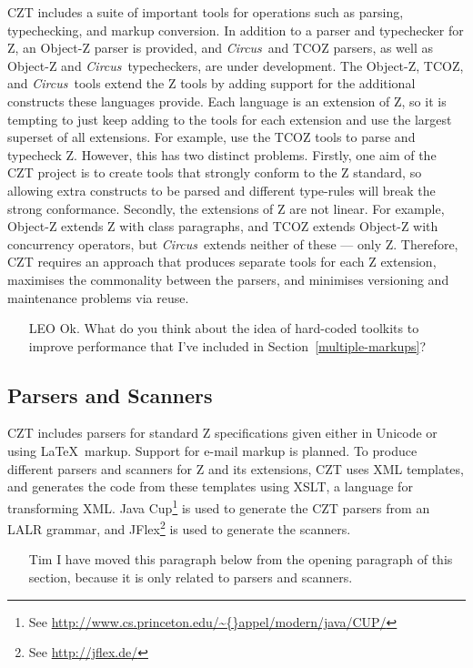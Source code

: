\documentclass{llncs}
\newcommand{\Circus}{{\sf\slshape Circus}}
\begin{document}
  CZT includes a suite of important tools for operations such as
  parsing, typechecking, and markup conversion. In addition to a
  parser and typechecker for Z, an Object-Z parser is provided, and
  \Circus\ and TCOZ parsers, as well as Object-Z and \Circus\
  typecheckers, are under development.  The Object-Z, TCOZ, and
  \Circus\ tools extend the Z tools by adding support for the
  additional constructs these languages provide.  Each language is an
  extension of Z, so it is tempting to just keep adding to the tools
  for each extension and use the largest superset of all
  extensions. For example, use the TCOZ tools to parse and typecheck
  Z. However, this has two distinct problems. Firstly, one aim of the
  CZT project is to create tools that strongly conform to the Z
  standard, so allowing extra constructs to be parsed and different
  type-rules will break the strong conformance. Secondly, the
  extensions of Z are not linear. For example, Object-Z extends Z with
  class paragraphs, and TCOZ extends Object-Z with concurrency
  operators, but \Circus\ extends neither of these --- only
  Z. Therefore, CZT requires an approach that produces separate tools
  for each Z extension, maximises the commonality between the parsers,
  and minimises versioning and maintenance problems via reuse.


  \begin{itemize}
    \item[LEO] Ok. What do you think about the idea of hard-coded toolkits to
               improve performance that I've included in Section~\ref{multiple-markups}?
  \end{itemize}

\subsection{Parsers and Scanners}

  CZT includes parsers for standard Z specifications given either in
  Unicode or using \LaTeX\ markup.  Support for e-mail markup is
  planned. To produce different parsers and scanners for Z and its
  extensions, CZT uses XML templates, and generates the code from these
  templates using XSLT, a language for transforming XML. Java
  Cup\footnote{See
  \url{http://www.cs.princeton.edu/\~{}appel/modern/java/CUP/}} is
  used to generate the CZT parsers from an LALR grammar, and
  JFlex\footnote{See \url{http://jflex.de/}} is used to generate the
  scanners. 

  \begin{itemize}
    \item[Tim] I have moved this paragraph below from the opening
    paragraph of this section, because it is only related to parsers
    and scanners.
  \end{itemize}
\end{document}
